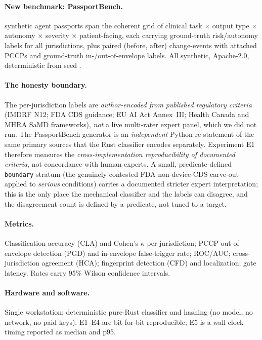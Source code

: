 \documentclass[11pt]{article}
\begin{document}
\paragraph{New benchmark: PassportBench.}\label{sec:benchmark} \NumPassports{}
synthetic agent passports span the coherent grid of clinical task $\times$ output type
$\times$ autonomy $\times$ severity $\times$ patient-facing, each carrying
ground-truth risk/autonomy labels for all \NumJur{} jurisdictions, plus \NumChanges{}
paired (before, after) change-events with attached PCCPs and ground-truth
in-/out-of-envelope labels. All synthetic, Apache-2.0, deterministic from seed \Seed.

\paragraph{The honesty boundary.} The per-jurisdiction labels are
\emph{author-encoded from published regulatory criteria} (IMDRF N12; FDA CDS guidance;
EU AI Act Annex~III; Health Canada and MHRA SaMD frameworks), \emph{not} a live
multi-rater expert panel, which we did not run. The PassportBench generator is an
\emph{independent} Python re-statement of the same primary sources that the Rust
classifier encodes separately. Experiment E1 therefore measures the
\emph{cross-implementation reproducibility of documented criteria}, not concordance
with human experts. A small, predicate-defined \texttt{boundary} stratum (the
genuinely contested FDA non-device-CDS carve-out applied to \emph{serious} conditions)
carries a documented stricter expert interpretation; this is the only place the
mechanical classifier and the labels can disagree, and the disagreement count is
defined by a predicate, not tuned to a target.

\paragraph{Metrics.} Classification accuracy (CLA) and Cohen's $\kappa$ per
jurisdiction; PCCP out-of-envelope detection (PGD) and in-envelope false-trigger rate;
ROC/AUC; cross-jurisdiction agreement (HCA); fingerprint detection (CFD) and
localization; gate latency. Rates carry 95\% Wilson confidence intervals.

\paragraph{Hardware and software.} Single workstation; deterministic pure-Rust
classifier and hashing (no model, no network, no paid keys). E1--E4 are bit-for-bit
reproducible; E5 is a wall-clock timing reported as median and p95.
\end{document}
